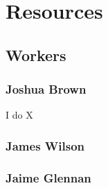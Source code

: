
\chapter{Resources} %

\label{Part9Chapter4} %



\section{Workers}



\subsection{Joshua Brown}

I do X


\subsection{James Wilson}


\subsection{Jaime Glennan}

